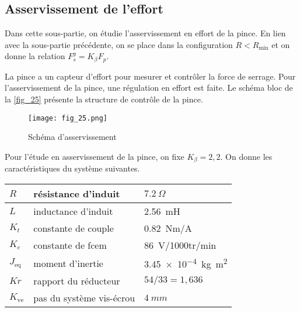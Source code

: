 

\subsection{Asservissement de l'effort}

\begin{obj}
Dans cette sous-partie, on étudie l’asservissement en effort de la pince. En lien avec la
sous-partie précédente, on se place dans la configuration $R < R_{\text{min}}$ et on donne la relation
$F_s^y = K_{\beta} F_p$.
\end{obj}


La pince a un capteur d'effort pour mesurer et contrôler la force de serrage. Pour l'asservissement
de la pince, une régulation en effort est faite. Le schéma bloc de la \autoref{fig_25} présente la structure
de contrôle de la pince.


\begin{figure}[H]
\centering
\texttt{[image: fig\_25.png]}
\caption{Schéma d'asservissement \label{fig_25}}
\end{figure}




Pour l’étude en asservissement de la pince, on fixe $K_{\beta} = 2,2$.
On donne les caractéristiques du système suivantes.

\begin{table}[H]
\centering
\begin{tabular}{lll}
\hline
$R$ &  résistance d'induit 		& $\SI{7,2}{\Omega}$ \\ \hline
$L$ &   inductance d'induit 	& \SI{2,56}{mH} \\ \hline
$K_t$ &  constante de couple 	& \SI{0,82}{Nm/A} \\ \hline
$K_e$ &  constante de fcem 	& \SI{86}{V/1000tr/min} \\ \hline
$J_{\text{eq}}$ &  moment d'inertie 	& \SI{3,45e-4}{ kg m^2} \\ \hline
$Kr$ &  rapport du réducteur 	& $54/33=1,636$ \\ \hline
$K_{\text{ve}}$ & pas du système vis-écrou & $\SI{4}{mm}$  \\ \hline
\end{tabular}
\end{table}


